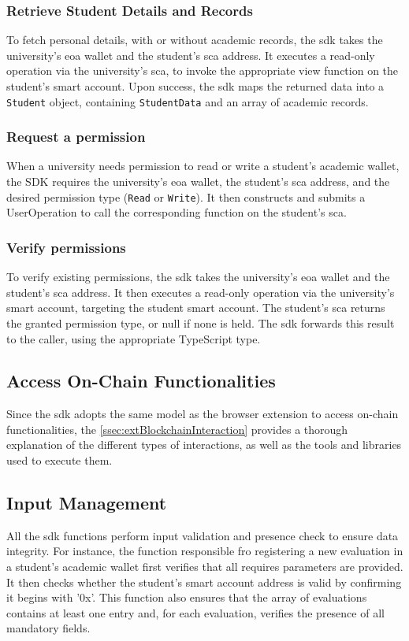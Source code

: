 \subsubsection{Retrieve Student Details and Records}
To fetch personal details, with or without academic records, the \acrshort{sdk} takes the university's \acrshort{eoa} wallet and the student's \acrshort{sca} address. It executes a read-only operation via the university's \acrshort{sca}, to invoke the appropriate view function on the student's smart account. Upon success, the \acrshort{sdk} maps the returned data into a \texttt{Student} object, containing \texttt{StudentData} and an array of academic records.

\subsubsection{Request a permission}
When a university needs permission to read or write a student’s academic wallet, the SDK requires the university’s \acrshort{eoa} wallet, the student’s \acrshort{sca} address, and the desired permission type (\texttt{Read} or \texttt{Write}). It then constructs and submits a UserOperation to call the corresponding function on the student’s \acrshort{sca}.

\subsubsection{Verify permissions}
To verify existing permissions, the \acrshort{sdk} takes the university's \acrshort{eoa} wallet and the student's \acrshort{sca} address. It then executes a read-only operation via the university's smart account, targeting the student smart account. The student's \acrshort{sca} returns the granted permission type, or null if none is held. The \acrshort{sdk} forwards this result to the caller, using the appropriate TypeScript type.

\subsection{Access On-Chain Functionalities}
Since the \acrshort{sdk} adopts the same model as the browser extension to access on-chain functionalities, the \cref{ssec:extBlockchainInteraction} provides a thorough explanation of the different types of interactions, as well as the tools and libraries used to execute them.

\subsection{Input Management}
All the \acrshort{sdk} functions perform input validation and presence check to ensure data integrity. For instance, the function responsible fro registering a new evaluation in a student's academic wallet first verifies that all requires parameters are provided. It then checks whether the student's smart account address is valid by confirming it begins with '0x'. This function also ensures that the array of evaluations contains at least one entry and, for each evaluation, verifies the presence of all mandatory fields.

